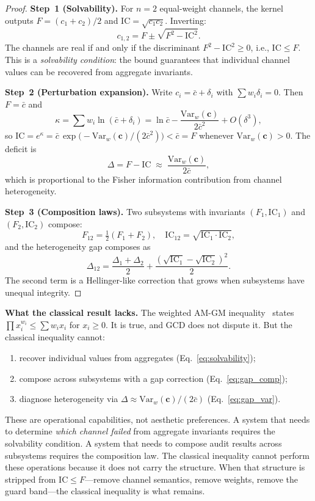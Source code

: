 \documentclass[
  aps,
  prd,
  twocolumn,
  superscriptaddress,
  nofootinbib,
  floatfix
]{revtex4-2}
\newcommand{\beq}{\begin{equation}}
\newcommand{\eeq}{\end{equation}}
\newcommand{\tvec}{\mathbf{c}}
\newcommand{\IC}{\mathrm{IC}}
\begin{document}
\begin{proof}
\textbf{Step~1 (Solvability).}
For $n = 2$ equal-weight channels, the kernel outputs
$F = (c_1 + c_2)/2$ and $\IC = \sqrt{c_1 c_2}$.
Inverting:
\beq
  c_{1,2} = F \pm \sqrt{F^2 - \IC^2}.
  \label{eq:solvability}
\eeq
The channels are real if and only if the discriminant
$F^2 - \IC^2 \geq 0$, i.e., $\IC \leq F$.  This is a
\emph{solvability condition}: the bound guarantees that
individual channel values can be recovered from aggregate
invariants.

\textbf{Step~2 (Perturbation expansion).}
Write $c_i = \bar{c} + \delta_i$ with $\sum w_i \delta_i = 0$.
Then $F = \bar{c}$ and
\beq
  \kappa = \sum w_i \ln(\bar{c} + \delta_i)
  = \ln\bar{c} - \frac{\mathrm{Var}_w(\tvec)}{2\bar{c}^2}
    + O(\delta^3),
  \label{eq:kappa_expand}
\eeq
so $\IC = e^\kappa = \bar{c}\,\exp\!\bigl(
  -\mathrm{Var}_w(\tvec)/(2\bar{c}^2)\bigr) < \bar{c} = F$
whenever $\mathrm{Var}_w(\tvec) > 0$.  The deficit is
\beq
  \Delta = F - \IC
  \;\approx\; \frac{\mathrm{Var}_w(\tvec)}{2\bar{c}},
  \label{eq:gap_var}
\eeq
which is proportional to the Fisher information
contribution from channel heterogeneity.

\textbf{Step~3 (Composition laws).}
Two subsystems with invariants $(F_1, \IC_1)$ and
$(F_2, \IC_2)$ compose:
\beq
  F_{12} = \tfrac{1}{2}(F_1 + F_2), \quad
  \IC_{12} = \sqrt{\IC_1 \cdot \IC_2},
\eeq
and the heterogeneity gap composes as
\beq
  \Delta_{12} = \frac{\Delta_1 + \Delta_2}{2}
  + \frac{(\sqrt{\IC_1} - \sqrt{\IC_2})^2}{2}.
  \label{eq:gap_comp}
\eeq
The second term is a Hellinger-like correction that grows
when subsystems have unequal integrity.
\end{proof}

\noindent\textbf{What the classical result lacks.}
The weighted AM-GM inequality~\cite{hardylittlewoodpolya1952}
states $\prod x_i^{w_i} \leq \sum w_i x_i$ for $x_i \geq 0$.
It is true, and GCD does not dispute it.  But the classical
inequality cannot:
\begin{enumerate}[leftmargin=*,label=(\alph*)]
\item recover individual values from aggregates
  (Eq.~\ref{eq:solvability});
\item compose across subsystems with a gap
  correction (Eq.~\ref{eq:gap_comp});
\item diagnose heterogeneity via $\Delta \approx
  \mathrm{Var}_w(\tvec)/(2\bar{c})$
  (Eq.~\ref{eq:gap_var}).
\end{enumerate}
These are operational capabilities, not aesthetic preferences.
A system that needs to determine \emph{which channel failed}
from aggregate invariants requires the solvability condition.
A system that needs to compose audit results across subsystems
requires the composition law.  The classical inequality cannot
perform these operations because it does not carry the structure.
When that structure is stripped from $\IC \leq F$---remove
channel semantics, remove weights, remove the guard band---the
classical inequality is what remains.
\end{document}
